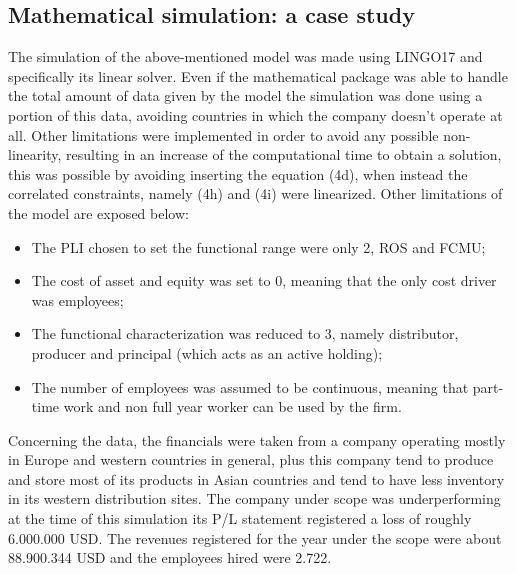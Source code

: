 \begin{doublespace}
\section{Mathematical simulation: a case study}
The simulation of the above-mentioned model was made using LINGO17 and specifically its linear solver. Even if the mathematical package was able to handle the total amount of data given by the model the simulation was done using a portion of this data, avoiding countries in which the company doesn't operate at all. Other limitations were implemented in order to avoid any possible non-linearity, resulting in an increase of the computational time to obtain a solution, this was possible by avoiding inserting the equation (4d), when instead the correlated constraints, namely (4h) and (4i) were linearized. Other limitations of the model are exposed below:
\begin{itemize}
    \item The PLI chosen to set the functional range were only 2, ROS and FCMU;
    \item The cost of asset and equity was set to 0, meaning that the only cost driver was employees;
    \item The functional characterization was reduced to 3, namely distributor, producer and principal (which acts as an active holding);
    \item The number of employees was assumed to be continuous, meaning that part-time work and non full year worker can be used by the firm.
\end{itemize}

Concerning the data, the financials were taken from a company operating mostly in Europe and western countries in general, plus this company tend to produce and store most of its products in Asian countries and tend to have less inventory in its western distribution sites. The company under scope was underperforming at the time of this simulation its P/L statement registered a loss of roughly  6.000.000 USD. The revenues registered for the year under the scope were about 88.900.344 USD and the employees hired were 2.722.


\end{doublespace}
